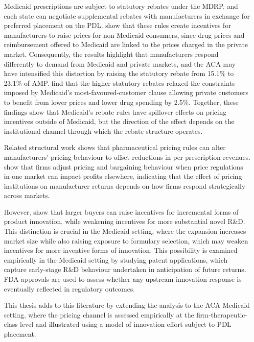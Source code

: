 \documentclass[12pt]{article}
\begin{document}
Medicaid prescriptions are subject to statutory rebates under the MDRP, and each state can negotiate supplemental rebates with manufacturers in exchange for preferred placement on the PDL. \cite{duggan2006distortionary} show that these rules create incentives for manufacturers to raise prices for non-Medicaid consumers, since drug prices and reimbursement offered to Medicaid are linked to the prices charged in the private market. Consequently, the results highlight that manufacturers respond differently to demand from Medicaid and private markets, and the ACA may have intensified this distortion by raising the statutory rebate from 15.1\% to 23.1\% of AMP. \cite{feng2023profiting} find that the higher statutory rebates relaxed the constraints imposed by Medicaid's most-favoured-customer clause allowing private customers to benefit from lower prices and lower drug spending by 2.5\%. Together, these findings show that Medicaid's rebate rules have spillover effects on pricing incentives outside of Medicaid, but the direction of the effect depends on the institutional channel through which the rebate structure operates.

Related structural work shows that pharmaceutical pricing rules can alter manufacturers' pricing behaviour to offset reductions in per-prescription revenues. \cite{dubois2022bargaining} show that firms adjust pricing and bargaining behaviour when price regulations in one market can impact profits elsewhere, indicating that the effect of pricing institutions on manufacturer returns depends on how firms respond strategically across markets.

However, \cite{inderst2007buyer} show that larger buyers can raise incentives for incremental forms of product innovation, while weakening incentives for more substantial novel R\&D. This distinction is crucial in the Medicaid setting, where the expansion increases market size while also raising exposure to formulary selection, which may weaken incentives for more inventive forms of innovation. This possibility is examined empirically in the Medicaid setting by studying patent applications, which capture early-stage R\&D behaviour undertaken in anticipation of future returns. FDA approvals are used to assess whether any upstream innovation response is eventually reflected in regulatory outcomes.

This thesis adds to this literature by extending the analysis to the ACA Medicaid setting, where the pricing channel is assessed empirically at the firm-therapeutic-class level and illustrated using a model of innovation effort subject to PDL placement.
\end{document}
